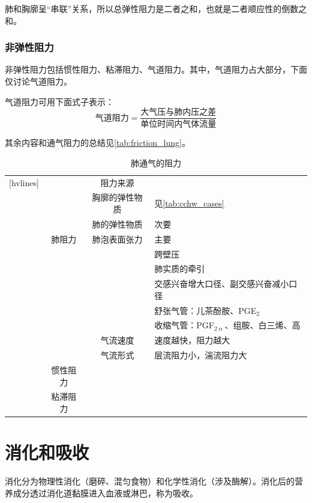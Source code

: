 肺和胸廓呈“串联”关系，所以总弹性阻力是二者之和，也就是二者顺应性的倒数之和。

\subsubsection{非弹性阻力}

非弹性阻力包括惯性阻力、粘滞阻力、气道阻力。其中，气道阻力占大部分，下面仅讨论气道阻力。

气道阻力可用下面式子表示：\[\text{气道阻力}=\frac{\text{大气压与肺内压之差}}{\text{单位时间内气体流量}}\]

其余内容和通气阻力的总结见\autoref{tab:friction_lung}。

\begin{table}[htbp]
	\centering
	\begin{NiceTabularX}{\textwidth}{cccX}[hvlines]
		 &  & 阻力来源 & \\
		 &  & 胸廓的弹性物质 & 见\autoref{tab:cchw_cases}\\
		&  & 肺的弹性物质 & 次要 \\
		& 肺阻力 & 肺泡表面张力 & 主要 \\
		 &  &  & 跨壁压\\
		&  &  & 肺实质的牵引 \\
		&  &  & 交感兴奋增大口径、副交感兴奋减小口径 \\
		&  &  & 舒张气管：儿茶酚胺、PGE$_2$ \\
		&  &  & 收缩气管：PGF$_{2\upalpha}$、组胺、白三烯、高 \\
		&  & 气流速度 & 速度越快，阻力越大\\
		&  & 气流形式 & 层流阻力小，湍流阻力大\\
		& 惯性阻力 &  & \\
		& 粘滞阻力 &  &
	\end{NiceTabularX}
	\caption{肺通气的阻力}
	\label{tab:friction_lung}
\end{table}

\section{消化和吸收}

消化分为物理性消化（磨碎、混匀食物）和化学性消化（涉及酶解）。消化后的营养成分透过消化道黏膜进入血液或淋巴，称为吸收。


